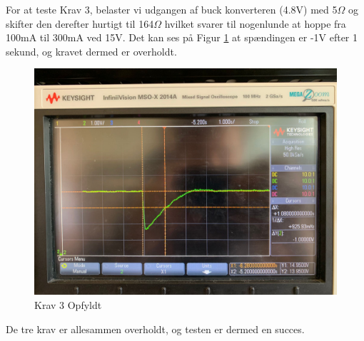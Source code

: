 \documentclass[../main.tex]{subfiles}
\begin{document}
For at teste Krav 3, belaster vi udgangen af buck konverteren (4.8V) med 5$\Omega$ og skifter den derefter hurtigt til 164$\Omega$ hvilket svarer til nogenlunde at hoppe fra 100mA til 300mA ved 15V. Det kan ses på Figur \ref{fig: Krav 3 Opfyldt} at spændingen er -1V efter 1 sekund, og kravet dermed er overholdt.
\begin{figure}[H]
      \includegraphics[width=\textwidth]{Dokumentation/Pictures/Krav3.jpg}
     \caption{Krav 3 Opfyldt}
     \label{fig: Krav 3 Opfyldt}
     \end{figure}

De tre krav er allesammen overholdt, og testen er dermed en succes. 

     
\end{document}
